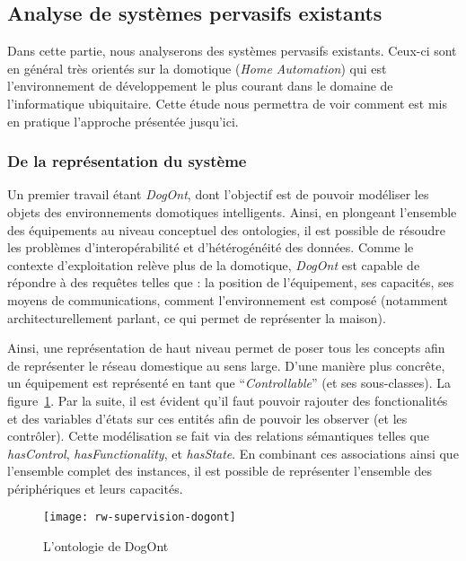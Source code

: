 \subsection{Analyse de systèmes pervasifs existants}
Dans cette partie, nous analyserons des systèmes pervasifs existants. Ceux-ci sont en général très orientés sur la domotique (\textit{Home Automation}) qui est l'environnement de développement le plus courant dans le domaine de l'informatique ubiquitaire. Cette étude nous permettra de voir comment est mis en pratique l'approche présentée jusqu'ici.

\subsubsection{De la représentation du système}
Un premier travail étant \textit{DogOnt}\cite{Bonino:dogont}, dont l'objectif est de pouvoir modéliser les objets des environnements domotiques intelligents. Ainsi, en plongeant l'ensemble des équipements au niveau conceptuel des ontologies, il est possible de résoudre les problèmes d'interopérabilité et d'hétérogénéité des données. Comme le contexte d'exploitation relève plus de la domotique, \textit{DogOnt} est capable de répondre à des requêtes telles que : la position de l'équipement, ses capacités, ses moyens de communications, comment l'environnement est composé (notamment architecturellement parlant, ce qui permet de représenter la maison).

Ainsi, une représentation de haut niveau permet de poser tous les concepts afin de représenter le réseau domestique au sens large. D'une manière plus concrête, un équipement est représenté en tant que \enquote{\it Controllable} (et ses sous-classes). La figure~\ref{fig:rw:supervision:dogont}. Par la suite, il est évident qu'il faut pouvoir rajouter des fonctionalités et des variables d'états sur ces entités afin de pouvoir les observer (et les contrôler). Cette modélisation se fait via des relations sémantiques telles que \textit{hasControl}, \textit{hasFunctionality}, et \textit{hasState}. En combinant ces associations ainsi que l'ensemble complet des instances, il est possible de représenter l'ensemble des périphériques et leurs capacités.

\begin{figure}[ht]
    \centering
    \texttt{[image: rw-supervision-dogont]}
    \caption{L'ontologie de DogOnt}\label{fig:rw:supervision:dogont}
\end{figure}

